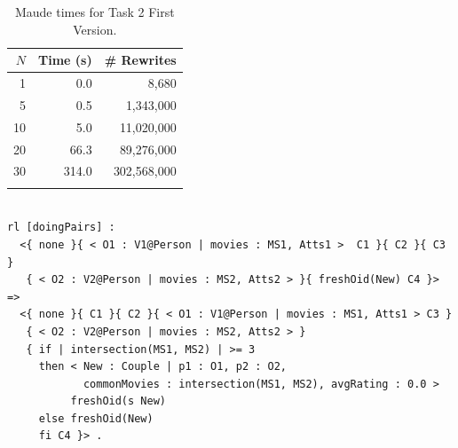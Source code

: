 \begin{table}[htb]
\renewcommand{\tabcolsep}{6pt}
\renewcommand{\arraystretch}{1.2}
    \centering
	\begin{tabular}{r r r}
	$N$ & Time (s) & \# Rewrites \\
	\hline
	1 & 0.0 & 8,680 \\
	5 & 0.5 & 1,343,000 \\
	10 & 5.0 & 11,020,000 \\
	20 & 66.3 & 89,276,000 \\
	30 & 314.0 & 302,568,000 \\
	\hline \\
	\end{tabular}
	\caption{Maude times for Task 2 First Version.}\label{table:maudetask21}
\end{table}

 

\begin{lstlisting}[caption=\code{doingCouples} Maude rule., label=lst:task2SecondVersion]

rl [doingPairs] :
  <{ none }{ < O1 : V1@Person | movies : MS1, Atts1 >  C1 }{ C2 }{ C3 }
   { < O2 : V2@Person | movies : MS2, Atts2 > }{ freshOid(New) C4 }>
=> 
  <{ none }{ C1 }{ C2 }{ < O1 : V1@Person | movies : MS1, Atts1 > C3 }
   { < O2 : V2@Person | movies : MS2, Atts2 > }
   { if | intersection(MS1, MS2) | >= 3 
     then < New : Couple | p1 : O1, p2 : O2, 
            commonMovies : intersection(MS1, MS2), avgRating : 0.0 >
          freshOid(s New)
     else freshOid(New)
     fi C4 }> .
\end{lstlisting}
